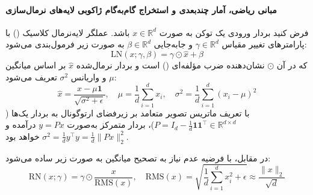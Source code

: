 \paragraph*{مبانی ریاضی، آمار چندبعدی و استخراج گام‌به‌گام ژاکوبی لایه‌های نرمال‌سازی}
فرض کنید بردار ورودی یک توکن به صورت $x \in \mathbb{R}^d$ باشد. عملگر لایه‌نرمال کلاسیک () \cite{ba2016layer} با پارامترهای تغییر مقیاس $\gamma \in \mathbb{R}^d$ و جابه‌جایی $\beta \in \mathbb{R}^d$ به صورت زیر فرمول‌بندی می‌شود:
\begin{equation}
    \text{LN}(x; \gamma, \beta) = \gamma \odot \hat{x} + \beta
\end{equation}
که در آن $\odot$ نشان‌دهنده ضرب مؤلفه‌ای () است و بردار نرمال‌شده $\hat{x}$ بر اساس میانگین $\mu$ و واریانس $\sigma^2$ تعریف می‌شود:
\begin{equation}
    \hat{x} = \frac{x - \mu\mathbf{1}}{\sqrt{\sigma^2 + \epsilon}}, \quad \mu = \frac{1}{d}\sum_{i=1}^d x_i, \quad \sigma^2 = \frac{1}{d}\sum_{i=1}^d (x_i - \mu)^2
\end{equation}
با تعریف ماتریس تصویر متعامد بر زیرفضای ارتوگونال به بردار یک‌ها ($P = I_d - \frac{1}{d}\mathbf{1}\mathbf{1}^\top \in \mathbb{R}^{d \times d}$)، بردار متمرکز به‌صورت $y = Px$ درآمده و $\sigma^2 = \frac{1}{d} y^\top y = \frac{1}{d} \|Px\|_2^2$ خواهد بود.

در مقابل،  \cite{zhang2019root} با فرضیه عدم نیاز به تصحیح میانگین به صورت زیر ساده می‌شود:
\begin{equation}
    \text{RN}(x; \gamma) = \gamma \odot \frac{x}{\text{RMS}(x)}, \quad \text{RMS}(x) = \sqrt{\frac{1}{d}\sum_{i=1}^d x_i^2 + \epsilon} \approx \frac{\|x\|_2}{\sqrt{d}}
\end{equation}

